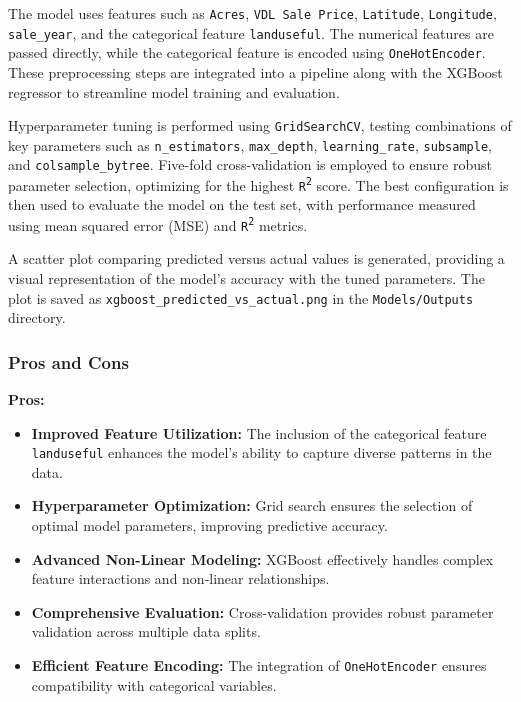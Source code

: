 The model uses features such as \texttt{Acres}, \texttt{VDL Sale Price}, \texttt{Latitude}, \texttt{Longitude}, \texttt{sale\_year}, and the categorical feature \texttt{landuseful}. The numerical features are passed directly, while the categorical feature is encoded using \texttt{OneHotEncoder}. These preprocessing steps are integrated into a pipeline along with the XGBoost regressor to streamline model training and evaluation. 

Hyperparameter tuning is performed using \texttt{GridSearchCV}, testing combinations of key parameters such as \texttt{n\_estimators}, \texttt{max\_depth}, \texttt{learning\_rate}, \texttt{subsample}, and \texttt{colsample\_bytree}. Five-fold cross-validation is employed to ensure robust parameter selection, optimizing for the highest \texttt{R\textsuperscript{2}} score. The best configuration is then used to evaluate the model on the test set, with performance measured using mean squared error (MSE) and \texttt{R\textsuperscript{2}} metrics.

A scatter plot comparing predicted versus actual values is generated, providing a visual representation of the model's accuracy with the tuned parameters. The plot is saved as \texttt{xgboost\_predicted\_vs\_actual.png} in the \texttt{Models/Outputs} directory.

\subsubsection*{Pros and Cons}

\textbf{Pros:}
\begin{itemize}
    \item \textbf{Improved Feature Utilization:} The inclusion of the categorical feature \texttt{landuseful} enhances the model's ability to capture diverse patterns in the data.
    \item \textbf{Hyperparameter Optimization:} Grid search ensures the selection of optimal model parameters, improving predictive accuracy.
    \item \textbf{Advanced Non-Linear Modeling:} XGBoost effectively handles complex feature interactions and non-linear relationships.
    \item \textbf{Comprehensive Evaluation:} Cross-validation provides robust parameter validation across multiple data splits.
    \item \textbf{Efficient Feature Encoding:} The integration of \texttt{OneHotEncoder} ensures compatibility with categorical variables.
\end{itemize}

